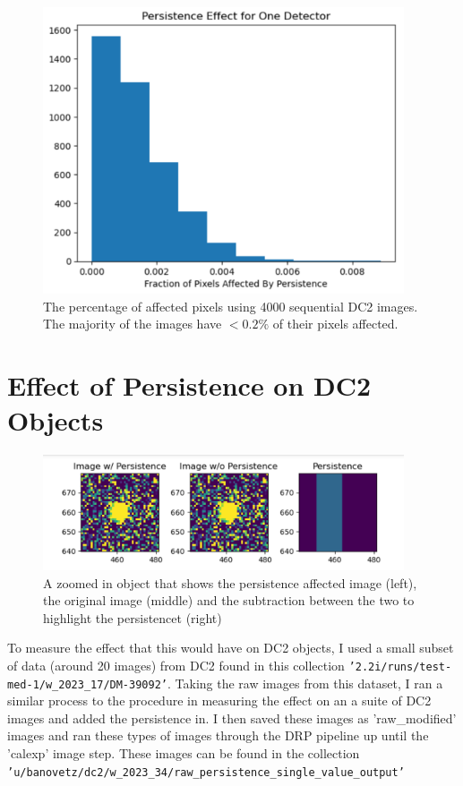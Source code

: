 \documentclass[DM,authoryear,toc]{lsstdoc}
\begin{document}
\begin{figure}[!htp]
  \centering
  \includegraphics[width=0.95\textwidth, angle=0]{DC2_percent_affected_pixels.png}
  \caption{
  The percentage of affected pixels using 4000 sequential DC2 images. The majority of the images have $<0.2\%$ of their pixels affected. 
  }
  \label{fig:affected_pixels}
\end{figure}


\section {Effect of Persistence on DC2 Objects}

\begin{figure}[!htp]
  \centering
  \includegraphics[width=0.95\textwidth, angle=0]{Obj_pers.png}
  \caption{
  A zoomed in object that shows the persistence affected image (left), the original image (middle) 
  and the subtraction between the two to highlight the persistencet (right)
  }
  \label{fig:obj_persistence}
\end{figure}

To measure the effect that this would have on DC2 objects, I used a small subset of data (around 20 images) from DC2 
found in this collection \texttt{'2.2i/runs/test-med-1/w_2023_17/DM-39092'}. 
Taking the raw images from this dataset, 
I ran a similar process to the procedure in measuring the effect on an a suite of DC2 images and added the persistence in. 
I then saved these images as 'raw_modified' images and ran these types of images through the DRP pipeline up until the 'calexp' image step.
These images can be found in the collection \texttt{'u/banovetz/dc2/w_2023_34/raw_persistence_single_value_output'}
\end{document}
